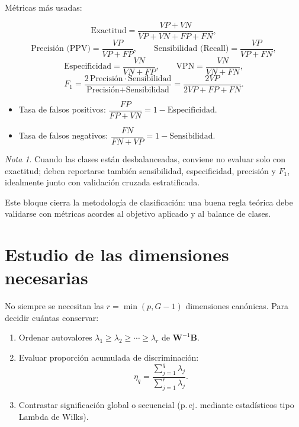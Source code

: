 \documentclass[12pt, a4paper]{article}
\theoremstyle{plain}
\theoremstyle{definition}
\theoremstyle{remark}
\newtheorem*{nota}{Nota}
\newcommand{\mat}[1]{\mathbf{#1}}
\begin{document}
Métricas más usadas:
\begin{mdframed}[style=resultado]
\[
  \text{Exactitud}=\frac{VP+VN}{VP+VN+FP+FN},
\]
\[
  \text{Precisión (PPV)}=\frac{VP}{VP+FP},
  \qquad
  \text{Sensibilidad (Recall)}=\frac{VP}{VP+FN},
\]
\[
  \text{Especificidad}=\frac{VN}{VN+FP},
  \qquad
  \text{VPN}=\frac{VN}{VN+FN},
\]
\[
  F_1=\frac{2\,\text{Precisión}\cdot\text{Sensibilidad}}
            {\text{Precisión}+\text{Sensibilidad}}
      =\frac{2VP}{2VP+FP+FN}.
\]
\end{mdframed}

\begin{itemize}
  \item Tasa de falsos positivos: $\dfrac{FP}{FP+VN}=1-\text{Especificidad}$.
  \item Tasa de falsos negativos: $\dfrac{FN}{FN+VP}=1-\text{Sensibilidad}$.
\end{itemize}

\begin{nota}
Cuando las clases están desbalanceadas, conviene no evaluar solo con
exactitud; deben reportarse también sensibilidad, especificidad, precisión
y $F_1$, idealmente junto con validación cruzada estratificada.
\end{nota}

Este bloque cierra la metodología de clasificación: una buena regla teórica
debe validarse con métricas acordes al objetivo aplicado y al balance de clases.

\section{Estudio de las dimensiones necesarias}

No siempre se necesitan las $r=\min(p,G-1)$ dimensiones canónicas.
Para decidir cuántas conservar:

\begin{enumerate}
  \item Ordenar autovalores
        $\lambda_1\ge\lambda_2\ge\cdots\ge\lambda_r$ de $\mat{W}^{-1}\mat{B}$.
  \item Evaluar proporción acumulada de discriminación:
        \[
          \eta_q=\frac{\sum_{j=1}^{q}\lambda_j}{\sum_{j=1}^{r}\lambda_j}.
        \]
  \item Contrastar significación global o secuencial (p.\,ej. mediante
        estadísticos tipo Lambda de Wilks).
\end{enumerate}
\end{document}
